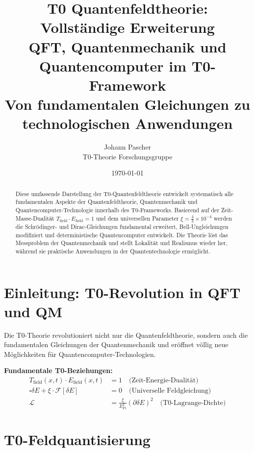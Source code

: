 \documentclass[12pt,a4paper]{article}
\title{T0 Quantenfeldtheorie: Vollständige Erweiterung \\
	QFT, Quantenmechanik und Quantencomputer im T0-Framework \\
	\large Von fundamentalen Gleichungen zu technologischen Anwendungen}
\author{Johann Pascher \\
	T0-Theorie Forschungsgruppe}
\date{\today}
\newcommand{\Efield}{E_{\text{field}}}
\newcommand{\xipar}{\xi}
\newcommand{\deltaE}{\delta E}
\newcommand{\EPlanck}{E_{\text{Pl}}}
\begin{document}
	
	\maketitle
	
	\begin{abstract}
		Diese umfassende Darstellung der T0-Quantenfeldtheorie entwickelt systematisch alle fundamentalen Aspekte der Quantenfeldtheorie, Quantenmechanik und Quantencomputer-Technologie innerhalb des T0-Frameworks. Basierend auf der Zeit-Masse-Dualität $T_{\text{field}} \cdot \Efield = 1$ und dem universellen Parameter $\xipar = \frac{4}{3} \times 10^{-4}$ werden die Schrödinger- und Dirac-Gleichungen fundamental erweitert, Bell-Ungleichungen modifiziert und deterministische Quantencomputer entwickelt. Die Theorie löst das Messproblem der Quantenmechanik und stellt Lokalität und Realismus wieder her, während sie praktische Anwendungen in der Quantentechnologie ermöglicht.
	\end{abstract}
	
	\tableofcontents
	\newpage
	
	\section{Einleitung: T0-Revolution in QFT und QM}
	
	Die T0-Theorie revolutioniert nicht nur die Quantenfeldtheorie, sondern auch die fundamentalen Gleichungen der Quantenmechanik und eröffnet völlig neue Möglichkeiten für Quantencomputer-Technologien.
	
	\begin{tcolorbox}[colback=blue!5!white,colframe=blue!75!black,title=T0-Grundprinzipien für QFT und QM]
		\textbf{Fundamentale T0-Beziehungen:}
		\begin{align}
			T_{\text{field}}(x,t) \cdot \Efield(x,t) &= 1 \quad \text{(Zeit-Energie-Dualität)} \\
			\square \deltaE + \xipar \cdot \mathcal{F}[\deltaE] &= 0 \quad \text{(Universelle Feldgleichung)} \\
			\mathcal{L} &= \frac{\xipar}{\EPlanck^2} (\partial \deltaE)^2 \quad \text{(T0-Lagrange-Dichte)}
		\end{align}
	\end{tcolorbox}
	
	\section{T0-Feldquantisierung}
	
\end{document}
